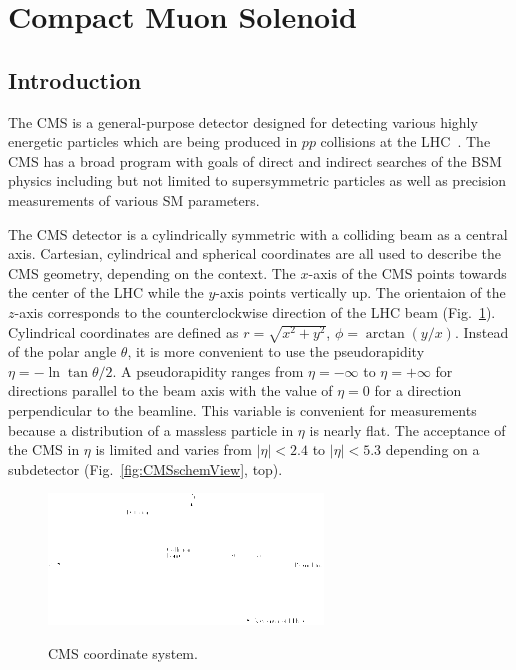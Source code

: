 \section{Compact Muon Solenoid}
\label{sec:Exp_CMS}
\subsection{Introduction}

The CMS is a general-purpose detector designed for detecting various highly energetic particles which are being produced in $pp$ collisions at the LHC~\cite{ref_CMS_TDR}. The CMS has a broad program with goals of direct and indirect searches of the BSM physics including but not limited to supersymmetric particles as well as precision measurements of various SM parameters. 


The CMS detector is a cylindrically symmetric with a colliding beam as a central axis. Cartesian, cylindrical and spherical coordinates are all used to describe the CMS geometry, depending on the context. The $x$-axis of the CMS points towards the center of the LHC while the $y$-axis points vertically up. The orientaion of the $z$-axis corresponds to the counterclockwise direction of the LHC beam (Fig.~\ref{fig:CMScoord}). Cylindrical coordinates are defined as $r=\sqrt{x^2+y^2}$, $\phi=\arctan(y/x)$. Instead of the polar angle $\theta$, it is more convenient to use the pseudorapidity $\eta=-\ln{\tan{\theta/2}}$. A pseudorapidity ranges from $\eta=-\infty$ to $\eta=+\infty$ for directions parallel to the beam axis with the value of $\eta=0$ for a direction perpendicular to the beamline. This variable is convenient for measurements because a distribution of a massless particle in $\eta$ is nearly flat. The acceptance of the CMS in $\eta$ is limited and varies from $|\eta|<2.4$ to $|\eta|<5.3$ depending on a subdetector (Fig.~\ref{fig:CMSschemView}, top).   

\begin{figure}[htb]
  \begin{center}
    {\includegraphics[width=0.65\textwidth]{../figs/Exp/CMScoord.png}}
    \caption{CMS coordinate system. }
    \label{fig:CMScoord}
  \end{center}
\end{figure}

